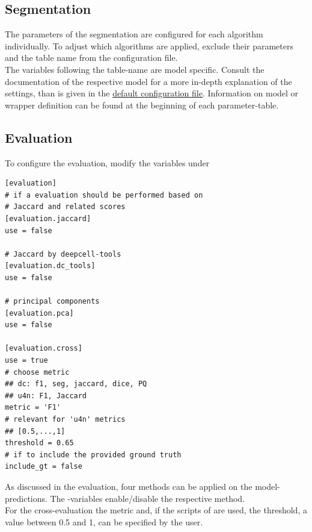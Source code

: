 \subsection*{Segmentation}
The parameters of the segmentation are configured for each algorithm individually. To adjust which algorithms are applied, exclude their parameters and the table name  from the configuration file. \\
The variables following the table-name are model specific. Consult the documentation of the respective model for a more in-depth explanation of the settings, than is given in the \href{https://github.com/AG-Sawitzki/XenSegEval/blob/main/config.toml}{default configuration file}. Information on model or wrapper definition can be found at the beginning of each parameter-table.\\
\subsection*{Evaluation}
To configure the evaluation, modify the variables under \inlinecode{[evaluation]}
\begin{lstlisting}[style=customIni]
[evaluation]
# if a evaluation should be performed based on
# Jaccard and related scores
[evaluation.jaccard]
use = false

# Jaccard by deepcell-tools
[evaluation.dc_tools]
use = false

# principal components
[evaluation.pca]
use = false

[evaluation.cross]
use = true
# choose metric
## dc: f1, seg, jaccard, dice, PQ
## u4n: F1, Jaccard
metric = 'F1'
# relevant for 'u4n' metrics
## [0.5,...,1]
threshold = 0.65
# if to include the provided ground truth
include_gt = false
\end{lstlisting}
As discussed in the evaluation, four methods can be applied on the model-predictions. The -variables enable/disable the respective method.\\
For the cross-evaluation the metric and, if the scripts of  are used, the threshold, a value between 0.5 and 1, can be specified by the user.\\
